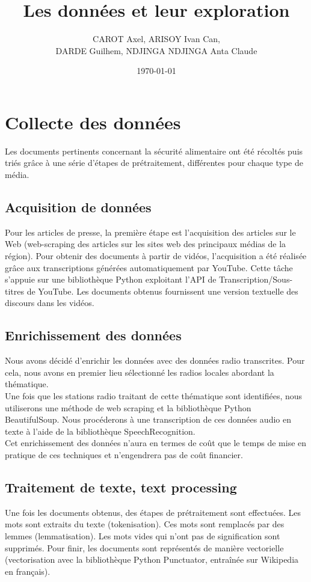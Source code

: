 \documentclass{article}
\title{Les données et leur exploration}
\author{CAROT Axel, ARISOY Ivan Can, \\ DARDE Guilhem, NDJINGA NDJINGA Anta Claude}
\date{\today}
\begin{document}
\maketitle

\section{Collecte des données}
Les documents pertinents concernant la sécurité alimentaire ont été récoltés puis triés grâce à une série d'étapes de prétraitement, différentes pour chaque type de média. 

\subsection{Acquisition de données}
Pour les articles de presse, la première étape est l'acquisition des articles sur le Web (web-scraping des articles sur les sites web des principaux médias de la région). Pour obtenir des documents à partir de vidéos, l'acquisition a été réalisée grâce aux transcriptions générées automatiquement par YouTube. Cette tâche s'appuie sur une bibliothèque Python exploitant l'API de Transcription/Sous-titres de YouTube. Les documents obtenus fournissent une version textuelle des discours dans les vidéos.

\subsection{Enrichissement des données}
Nous avons décidé d'enrichir les données avec des données radio transcrites. Pour cela, nous avons en premier lieu sélectionné les radios locales abordant la thématique. \\

Une fois que les stations radio traitant de cette thématique sont identifiées, nous utiliserons une méthode de web scraping et la bibliothèque Python BeautifulSoup. Nous procéderons à une transcription de ces données audio en texte à l'aide de la bibliothèque SpeechRecognition. \\

Cet enrichissement des données n'aura en termes de coût que le temps de mise en pratique de ces techniques et n'engendrera pas de coût financier. 

\subsection{Traitement de texte, text processing}
Une fois les documents obtenus, des étapes de prétraitement sont effectuées. Les mots sont extraits du texte (tokenisation). Ces mots sont remplacés par des lemmes (lemmatisation). Les mots vides qui n'ont pas de signification sont supprimés. Pour finir, les documents sont représentés de manière vectorielle (vectorisation avec la bibliothèque Python Punctuator, entraînée sur Wikipedia en français). 
\end{document}
